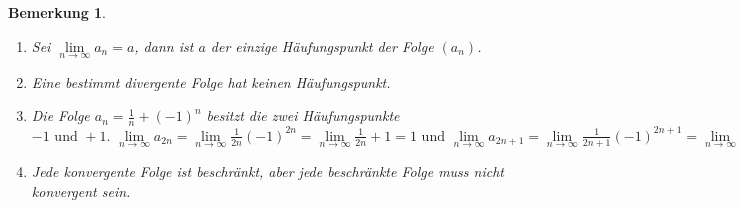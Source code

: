 \documentclass[a4paper,titlepage,oneside]{article}
\renewcommand{\liminf}[2][n]{\ensuremath{\lim\limits_{#1 \rightarrow \infty}{#2}}}
\theoremstyle{thmstyle}
\newtheorem{bem}[satz]{Bemerkung}
\begin{document}
\begin{bem}
\begin{enumerate}
\item Sei \(\liminf{a_n} = a\), dann ist \(a\) der einzige Häufungspunkt der Folge \((a_n)\).
\item Eine bestimmt divergente Folge hat keinen Häufungspunkt.
\item Die Folge \(a_n = \frac{1}{n}+ (-1)^n\) besitzt die zwei Häufungspunkte \(-1\text{ und }+1\text{. }\liminf{a_{2n}} = \liminf{\frac{1}{2n} (-1)^{2n}} = \liminf{\frac{1}{2n}} + 1 = 1 \text{ und } \liminf{a_{2n+1}} = \liminf{\frac{1}{2n+1} (-1)^{2n+1}} = \liminf{\frac{1}{2n+1}} - 1 = - 1\)
\item Jede konvergente Folge ist beschränkt, aber jede beschränkte Folge muss nicht konvergent sein.
\end{enumerate}
\end{bem}
\end{document}
